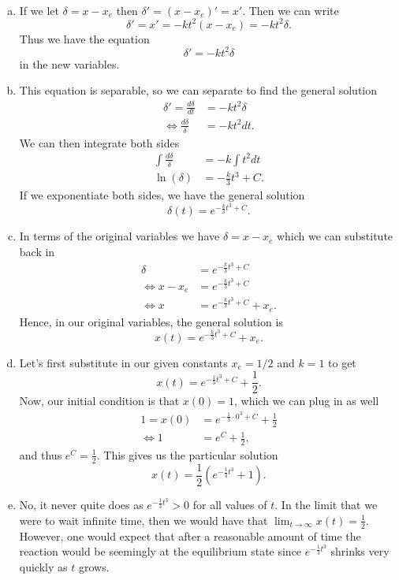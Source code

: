 \documentclass[12pt]{amsbook}
\begin{document}
\begin{solution}~
\begin{enumerate}[(a)]
    \item If we let $\delta=x-x_e$ then $\delta'=(x-x_e)'=x'$.  Then we can write
    \[
    \delta'=x'=-kt^2(x-x_e)=-kt^2\delta.
    \]
    Thus we have the equation
    \[
    \boxed{\delta' = -kt^2 \delta}
    \]
    in the new variables.
    \item This equation is separable, so we can separate to find the general solution
    \begin{align*}
        \delta'=\frac{d\delta}{dt}&=-kt^2\delta\\
        \iff \frac{d\delta}{\delta}&= -kt^2dt.
    \end{align*}
    We can then integrate both sides
    \begin{align*}
        \int \frac{d \delta}{\delta}&=-k \int t^2 dt\\
        \ln(\delta)&= -\frac{k}{3}t^3 + C.
    \end{align*}
    If we exponentiate both sides, we have the general solution
    \[
    \boxed{\delta(t) = e^{-\frac{k}{3}t^3+C}.}
    \]
    \item In terms of the original variables we have $\delta=x-x_e$ which we can substitute back in
    \begin{align*}
        \delta &= e^{-\frac{k}{3}t^3+C}\\
        \iff x-x_e &= e^{-\frac{k}{3}t^3+C}\\
        \iff x&= e^{-\frac{k}{3}t^3+C}+x_e.
    \end{align*}
    Hence, in our original variables, the general solution is
    \[
    \boxed{x(t)=e^{-\frac{k}{3}t^3+C}+x_e.}
    \]
    \item Let's first substitute in our given constants $x_e=1/2$ and $k=1$ to get
    \[
    x(t)=e^{-\frac{1}{3}t^3+C}+\frac{1}{2}.
    \]
    Now, our initial condition is that $x(0)=1$, which we can plug in as well
    \begin{align*}
        1=x(0)&=e^{-\frac{1}{3}\cdot 0^3 + C}+\frac{1}{2}\\
        \iff 1&= e^C+\frac{1}{2},
    \end{align*}
    and thus $e^C=\frac{1}{2}$.  This gives us the particular solution
    \[
    \boxed{x(t)=\frac{1}{2}\left(e^{-\frac{1}{3}t^3}+1\right).}
    \]
    \item No, it never quite does as $e^{-\frac{1}{3}t^3}>0$ for all values of $t$.  In the limit that we were to wait infinite time, then we would have that $\lim_{t\to \infty} x(t)=\frac{1}{2}$. However, one would expect that after a reasonable amount of time the reaction would be seemingly at the equilibrium state since $e^{-\frac{1}{3}t^3}$ shrinks very quickly as $t$ grows.
\end{enumerate}
\end{solution}
\end{document}
